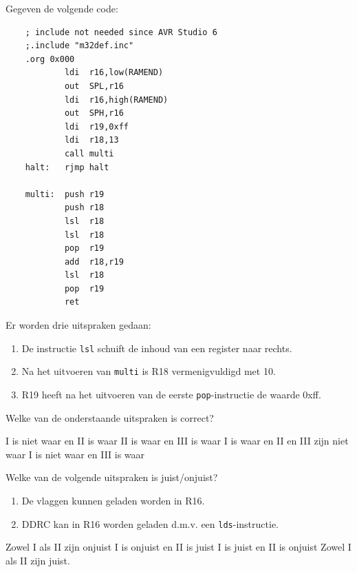 \documentclass[a4paper,12pt,fleqn,dutch,mimicwordtwentyten]{tisdexam}
\begin{document}
\begin{questions}
\question
\label{opg:opg19}
Gegeven de volgende code:
\begin{lstlisting}
    ; include not needed since AVR Studio 6
    ;.include "m32def.inc"
    .org 0x000
            ldi  r16,low(RAMEND)
            out  SPL,r16
            ldi  r16,high(RAMEND)
            out  SPH,r16
            ldi  r19,0xff
            ldi  r18,13
            call multi
    halt:   rjmp halt

    multi:  push r19
            push r18
            lsl  r18
            lsl  r18
            pop  r19
            add  r18,r19
            lsl  r18
            pop  r19
            ret
\end{lstlisting}

Er worden drie uitspraken gedaan:
\begin{enumerate}[itemsep=-1pt,leftmargin=23pt,label=\Roman*.]
\item De instructie \texttt{lsl} schuift de inhoud van een register naar rechts.
\item Na het uitvoeren van \texttt{multi} is R18 vermenigvuldigd met 10.
\item R19 heeft na het uitvoeren van de eerste \texttt{pop}-instructie de waarde 0x{f}{f}.
\end{enumerate}
Welke van de onderstaande uitspraken is correct?
\begin{choices}
	\CorrectChoice \label{ans:opg19} I is niet waar en II is waar
	\choice II is waar en III is waar
	\choice I is waar en II en III zijn niet waar
	\choice I is niet waar en III is waar
\end{choices}


\question
\label{opg:opg20}
Welke van de volgende uitspraken is juist/onjuist?
\begin{enumerate}[itemsep=-1pt,leftmargin=23pt,label=\Roman*.]
	\item De vlaggen kunnen geladen worden in R16.
	\item DDRC kan in R16 worden geladen d.m.v. een \texttt{lds}-instructie.
\end{enumerate}
\begin{choices}
	\choice Zowel I als II zijn onjuist
	\choice I is onjuist en II is juist
	\choice I is juist en II is onjuist
	\CorrectChoice \label{ans:opg20} Zowel I als II zijn juist.
\end{choices}




\end{questions}
\end{document}
